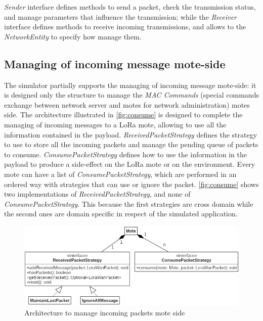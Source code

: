 \noindent \mbox{\textit{Sender}} interface defines methods to send a packet, check the transmission status, and manage parameters that influence the transmission; while the \mbox{\textit{Receiver}} interface defines methods to receive incoming transmissions, and allows to the \mbox{\textit{NetworkEntity}} to specify how manage them.

\subsection*{Managing of incoming message mote-side}

The simulator partially supports the managing of incoming message mote-side: it is designed only the structure to manage the \textit{MAC Commands} (special commands exchange between network server and motes for network administration) motes side.
The architecture illustrated in \autoref{fig:consume} is designed to complete the managing of incoming messages to a LoRa mote, allowing to use all the information contained in the payload.
\mbox{\textit{ReceivedPacketStrategy}} defines the strategy to use to store all the incoming packets and manage the pending queue of packets to consume.
\mbox{\textit{ConsumePacketStrategy}} defines how to use the information in the payload to produce a side-effect on the LoRa mote or on the environment. 
Every mote can have a list of \mbox{\textit{ConsumePacketStrategy}}, which are performed in an ordered way with strategies that can use or ignore the packet.
\autoref{fig:consume} shows two implementations of \mbox{\textit{ReceivedPacketStrategy}}, and none of \mbox{\textit{ConsumePacketStrategy}}. This because the first strategies are cross domain while the second ones are domain specific in respect of the simulated application.
% 
\begin{figure}[H]
    \centering
    \includegraphics[width=\textwidth]{figures/consumePacket.png}
    \caption{Architecture to manage incoming packets mote side}
    \label{fig:consume}
\end{figure}
% 


